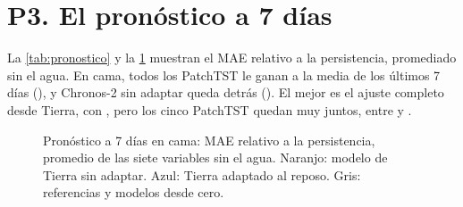 \begin{table}[htbp]
\caption[Error del adaptado frente al de Tierra, por persona]{Error del valor esperado del adaptado ($k = 28$) dividido
por el del monitor de Tierra, calculado persona por persona.}
\label{tab:por-persona}
\small

\end{table}

\section{P3. El pronóstico a 7 días}\label{sec:res-pronostico}

La \cref{tab:pronostico} y la \cref{fig:pronostico} muestran el MAE relativo a la persistencia, promediado sin el agua. En
cama, todos los PatchTST le ganan a la media de los últimos 7 días (), y Chronos-2 sin adaptar
queda detrás (). El mejor es el ajuste completo desde Tierra, con , pero los
cinco PatchTST quedan muy juntos, entre  y .

\begin{figure}[htbp]
\centering

\caption[MAE relativo a persistencia de cada modelo]{Pronóstico a 7 días en cama: MAE relativo a la persistencia,
promedio de las siete variables sin el agua. Naranjo: modelo de Tierra sin adaptar. Azul: Tierra adaptado al reposo.
Gris: referencias y modelos desde cero.}
\label{fig:pronostico}
\end{figure}

\begin{table}[htbp]
\caption[Pronóstico a 7 días por modelo]{MAE relativo a la persistencia, promedio sin el agua, en cama y en el
pre-reposo de los sujetos de prueba. Los modelos adaptados al reposo y los entrenados desde cero en el reposo solo se
evalúan en cama.}
\label{tab:pronostico}
\small

\end{table}

